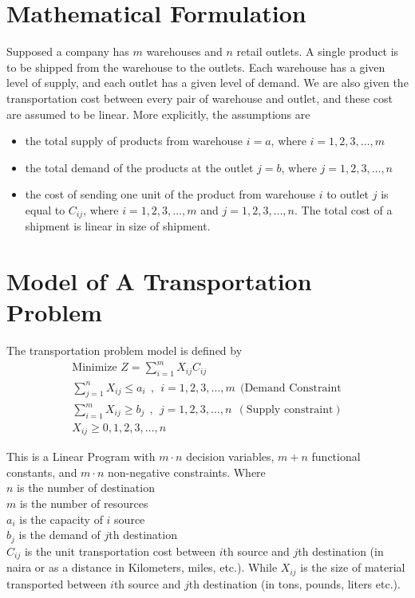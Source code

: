 \documentclass[12pt]{report}
\newcommand{\sps}{\\[0.2cm]}
\newcommand{\NI}{\noindent}
\newcommand{\tp}{Transportation Problem }
\newcommand{\stp}{transportation problem }
\begin{document}
	\section{Mathematical Formulation}
	Supposed a company has $m$ warehouses and $n$ retail outlets. A single product is to be shipped from the warehouse to the outlets. Each warehouse has a given level of supply, and each outlet has a given level of demand. We are also given the transportation cost between every pair of warehouse and outlet, and these cost are assumed to be linear. More explicitly, the assumptions are
	\begin{itemize}
		\item the total supply of products from warehouse $i=a$, where $i=1,2,3,\ldots, m$
		\item the total demand of the products at the outlet $j=b$, where $j=1,2,3,\ldots, n$
		\item the cost of sending one unit of the product from warehouse $i$ to outlet $j$ is equal to $C_{ij}$, where $i=1,2,3,\ldots,m$ and $j=1,2,3,\ldots,n$. The total cost of a shipment is linear in size of shipment.
	\end{itemize}
	
	\section{Model of A \tp}
	The \stp model is defined by
	\begin{gather}
		\text{Minimize } Z = \sum_{i=1}^{m}X_{ij}C_{ij}\label{eq:3_1}\sps
		\sum_{j=1}^{n}X_{ij} \leq a_i~~,~~ i=1,2,3,\ldots,m~~ (\text{Demand Constraint}\label{eq:3_2}\sps
		\sum_{i=1}^{m}X_{ij} \geq b_j~~,~~ j=1,2,3,\ldots,n~~ (\text{Supply constraint})\label{eq:3_3}\sps
		X_{ij} \geq 0,1,2,3,\ldots,n\label{eq:3_4}
	\end{gather}
	
	\NI This is a Linear Program with $m\cdot n$ decision variables, $m+n$ functional constants, and $m\cdot n$ non-negative constraints. Where\sps
	$n$ is the number of destination\\
	$m$ is the number of resources\\
	$a_i$ is the capacity of $i$ source\\
	$b_j$ is the demand of $j$th destination\\
	$C_{ij}$ is the unit transportation cost between $i$th source and $j$th destination (in naira or as a distance in Kilometers, miles, etc.). While $X_{ij}$ is the size of material transported between $i$th source and $j$th destination (in tons, pounds, liters etc.).\sps
	
\end{document}
